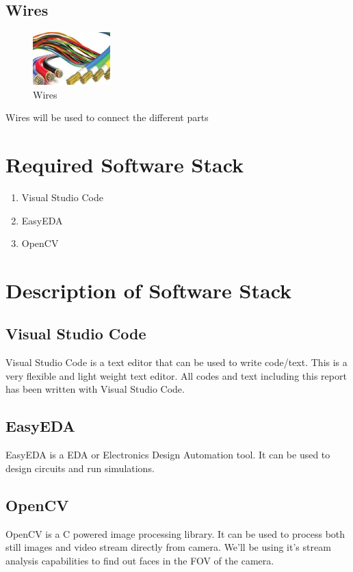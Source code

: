     \subsection{Wires}
        \begin{figure}[H]
            \centering
            \includegraphics[width=3cm]{images/wires.jpg}
            \caption{Wires}
        \end{figure}

        \begin{flushleft}
            Wires will be used to connect the different parts 
        \end{flushleft}

\section{Required Software Stack}
    \begin{enumerate}
        \item Visual Studio Code
        \item EasyEDA
        \item OpenCV
    \end{enumerate}

    
\section{Description of Software Stack}
    \subsection{Visual Studio Code}
    \begin{flushleft}
        Visual Studio Code is a text editor that can be used to write code/text. This is a very flexible and light weight text editor. All codes 
        and text including this report has been written with Visual Studio Code. 
    \end{flushleft}
    \subsection{EasyEDA}
    \begin{flushleft}
        EasyEDA is a EDA or Electronics Design Automation tool. It can be used to design circuits and run simulations.
    \end{flushleft}
    \subsection{OpenCV}
    \begin{flushleft}
        OpenCV is a C powered image processing library. It can be used to process both still images and video stream directly from camera. We'll be using 
        it's stream analysis capabilities to find out faces in the FOV of the camera. 
    \end{flushleft}